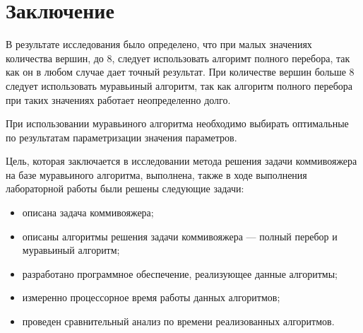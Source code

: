 \chapter*{Заключение}

В результате исследования было определено, 
что при малых значениях количества вершин, до 8, следует использовать алгоримт полного перебора, так 
как он в любом случае дает точный результат. При количестве вершин больше 8 следует использовать муравьиный алгоритм, 
так как алгоритм полного перебора при таких значениях работает неопределенно долго.

При использовании муравьиного алгоритма необходимо выбирать оптимальные по результатам параметризации
значения параметров.

Цель, которая заключается в исследовании метода 
решения задачи коммивояжера на базе муравьиного алгоритма, 
выполнена, также в ходе выполнения лабораторной 
работы были решены следующие задачи:
\begin{itemize}
    \item описана задача коммивояжера;
    \item описаны алгоритмы решения задачи коммивояжера --- полный перебор и муравьиный алгоритм;
    \item разработано программное обеспечение, реализующее данные алгоритмы;
    \item измеренно процессорное время работы данных алгоритмов;
    \item проведен сравнительный анализ по времени реализованных алгоритмов.
\end{itemize}

